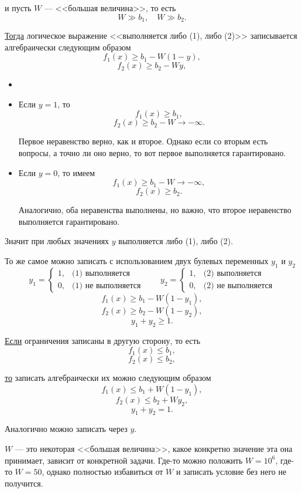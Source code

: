 и пусть $W$ --- <<большая величина>>, то есть
\[
W \gg b_1, \quad W \gg b_2.
\]

\underline{Тогда} логическое выражение <<выполняется либо (1), либо (2)>> записывается алгебраически следующим образом
\[f_1(x) \ge b_1 - W(1-y),\]
\[f_2(x) \ge b_2 - Wy,\]
\[\]

\prooof

\begin{itemize}[nosep]
	\item[]	
	\item Если $y = 1$, то
	\[f_1(x) \ge b_1,\]
	\[f_2(x) \ge b_2 - W \to -\infty.\]
	
	Первое неравенство верно, как и второе. Однако если со вторым есть вопросы, а точно ли оно верно, то вот первое выполняется гарантировано.
	
	\item Если $y = 0$, то имеем
	\[f_1(x) \ge b_1 - W \to -\infty,\]
	\[f_2(x) \ge b_2.\]
	
	Аналогично, оба неравенства выполнены, но важно, что второе неравенство выполняется гарантировано.
\end{itemize}

Значит при любых значениях $y$ выполняется либо (1), либо (2).

\remark

То же самое можно записать с использованием двух булевых переменных $y_1$ и $y_2$
\[
y_1 = \begin{cases}
	1,& \text{(1) выполняется}\\
	0,&\text{(1) не выполняется}
\end{cases} \quad\quad y_2 = \begin{cases}
1,& \text{(2) выполняется}\\
0,&\text{(2) не выполняется}
\end{cases}
\]
\[f_1(x) \ge b_1 - W(1-y_1),\]
\[f_2(x) \ge b_2 - W(1-y_2),\]
\[y_1+y_2 \ge 1.\]

\remark

\underline{Если} ограничения записаны в другую сторону, то есть
\[f_1(x) \le b_1,\]
\[f_2(x) \le b_2,\]

\underline{то} записать алгебраически их можно следующим образом
\[f_1(x) \le b_1 + W(1-y_1),\]
\[f_2(x) \le b_2 + Wy_2,\]
\[y_1 + y_2 = 1.\]

Аналогично можно записать через $y$.

\remark

$W$ --- это некоторая <<большая величина>>, какое конкретно значение эта она принимает, зависит от конкретной задачи. Где-то можно положить $W = 10^6$, где-то $W = 50$, однако полностью избавиться от $W$ и записать условие без него не получится.

